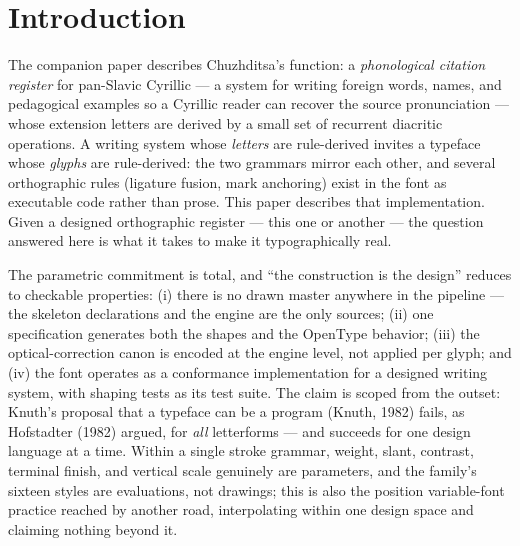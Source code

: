\documentclass[12pt]{article}
\begin{document}
\begin{abstract}
\medskip
\noindent\textbf{Implications for practice.} The transferable content is a set of named rules with stated rationales: union overlapping outlines before emitting, because coverage-summing rasterizers darken every seam and even-odd consumers open white slits; ship pair kerning as GPOS, because the legacy kern table is ignored in CFF-flavored fonts; widen advances with weight, because advance width is a property of the counter, not the stroke; trim advances on open-sided letters, whose apertures recede; and derive every coordinate from the parameter sheet, so that a value which holds in only one style is exposed as a bug rather than shipped as a glyph. Treating optical corrections as engine-level arithmetic lets them generalize across a large character set at no marginal cost. For designers extending scripts for new orthographies, the executable-reference-implementation pattern — spelling rules compiled as OpenType lookups and verified by shaping assertions — makes orthographic claims mechanically testable.
\end{abstract}

\section{Introduction}

The companion paper describes Chuzhditsa's function: a \emph{phonological citation register} for pan-Slavic Cyrillic — a system for writing foreign words, names, and pedagogical examples so a Cyrillic reader can recover the source pronunciation — whose extension letters are derived by a small set of recurrent diacritic operations. A writing system whose \emph{letters} are rule-derived invites a typeface whose \emph{glyphs} are rule-derived: the two grammars mirror each other, and several orthographic rules (ligature fusion, mark anchoring) exist in the font as executable code rather than prose. This paper describes that implementation. Given a designed orthographic register — this one or another — the question answered here is what it takes to make it typographically real.

The parametric commitment is total, and ``the construction is the design'' reduces to checkable properties: (i) there is no drawn master anywhere in the pipeline — the skeleton declarations and the engine are the only sources; (ii) one specification generates both the shapes and the OpenType behavior; (iii) the optical-correction canon is encoded at the engine level, not applied per glyph; and (iv) the font operates as a conformance implementation for a designed writing system, with shaping tests as its test suite. The claim is scoped from the outset: Knuth's proposal that a typeface can be a program (Knuth, 1982) fails, as Hofstadter (1982) argued, for \emph{all} letterforms — and succeeds for one design language at a time. Within a single stroke grammar, weight, slant, contrast, terminal finish, and vertical scale genuinely are parameters, and the family's sixteen styles are evaluations, not drawings; this is also the position variable-font practice reached by another road, interpolating within one design space and claiming nothing beyond it.
\end{document}
